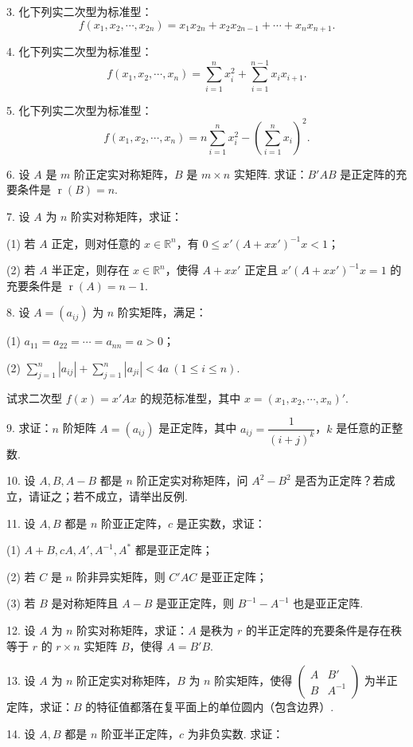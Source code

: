 \documentclass[UTF8,12pt,a4paper,fontset=fandol]{ctexart}
\begin{document}
3. 化下列实二次型为标准型：
\[
f(x_1,x_2,\cdots,x_{2n})=x_1x_{2n}+x_2x_{2n-1}+\cdots+x_nx_{n+1}.
\]

4. 化下列实二次型为标准型：
\[
f(x_1,x_2,\cdots,x_n)=\sum_{i=1}^n x_i^2+\sum_{i=1}^{n-1}x_ix_{i+1}.
\]

5. 化下列实二次型为标准型：
\[
f(x_1,x_2,\cdots,x_n)=n\sum_{i=1}^n x_i^2-\left(\sum_{i=1}^n x_i\right)^2.
\]

6. 设 $A$ 是 $m$ 阶正定实对称矩阵，$B$ 是 $m\times n$ 实矩阵. 求证：$B'AB$ 是正定阵的充要条件是 $\operatorname{r}(B)=n$.

7. 设 $A$ 为 $n$ 阶实对称矩阵，求证：

(1) 若 $A$ 正定，则对任意的 $x\in\mathbb{R}^n$，有 $0\le x'(A+xx')^{-1}x<1$；

(2) 若 $A$ 半正定，则存在 $x\in\mathbb{R}^n$，使得 $A+xx'$ 正定且 $x'(A+xx')^{-1}x=1$ 的充要条件是 $\operatorname{r}(A)=n-1$.

8. 设 $A=(a_{ij})$ 为 $n$ 阶实矩阵，满足：

(1) $a_{11}=a_{22}=\cdots=a_{nn}=a>0$；

(2) $\displaystyle\sum_{j=1}^n |a_{ij}|+\sum_{j=1}^n |a_{ji}|<4a\ (1\le i\le n)$.

试求二次型 $f(x)=x'Ax$ 的规范标准型，其中 $x=(x_1,x_2,\cdots,x_n)'$.

9. 求证：$n$ 阶矩阵 $A=(a_{ij})$ 是正定阵，其中 $a_{ij}=\dfrac1{(i+j)^k}$，$k$ 是任意的正整数.

10. 设 $A,B,A-B$ 都是 $n$ 阶正定实对称矩阵，问 $A^2-B^2$ 是否为正定阵？若成立，请证之；若不成立，请举出反例.

11. 设 $A,B$ 都是 $n$ 阶亚正定阵，$c$ 是正实数，求证：

(1) $A+B,cA,A',A^{-1},A^*$ 都是亚正定阵；

(2) 若 $C$ 是 $n$ 阶非异实矩阵，则 $C'AC$ 是亚正定阵；

(3) 若 $B$ 是对称矩阵且 $A-B$ 是亚正定阵，则 $B^{-1}-A^{-1}$ 也是亚正定阵.

12. 设 $A$ 为 $n$ 阶实对称矩阵，求证：$A$ 是秩为 $r$ 的半正定阵的充要条件是存在秩等于 $r$ 的 $r\times n$ 实矩阵 $B$，使得 $A=B'B$.

13. 设 $A$ 为 $n$ 阶正定实对称矩阵，$B$ 为 $n$ 阶实矩阵，使得 $\left(\begin{array}{cc}A&B'\\ B&A^{-1}\end{array}\right)$ 为半正定阵，求证：$B$ 的特征值都落在复平面上的单位圆内（包含边界）.

14. 设 $A,B$ 都是 $n$ 阶亚半正定阵，$c$ 为非负实数. 求证：
\end{document}
